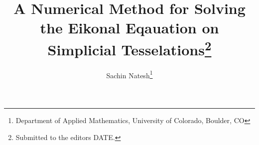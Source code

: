 

\usepackage{lipsum}
\usepackage{amsfonts}
\usepackage{graphicx}
\usepackage{epstopdf}
\usepackage{algorithm}
\usepackage{algpseudocode}
\ifpdf
\else
\fi

\newcommand{\creflastconjunction}{, and~}



\title{A Numerical Method for Solving the Eikonal Eqauation on Simplicial Tesselations\thanks{Submitted to the editors DATE.
}}

\author{Sachin Natesh\thanks{Department of Applied Mathematics, University of Colorado, Boulder, CO}}

\usepackage{amsopn}
\DeclareMathOperator{\diag}{diag}


